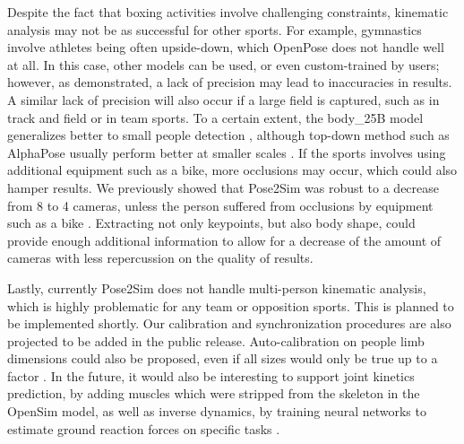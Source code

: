 Despite the fact that boxing activities involve challenging constraints, kinematic analysis may not be as successful for other sports. For example, gymnastics involve athletes being often upside-down, which OpenPose does not handle well at all. In this case, other models can be used, or even custom-trained by users; however, as demonstrated, a lack of precision may lead to inaccuracies in results. A similar lack of precision will also occur if a large field is captured, such as in track and field or in team sports. To a certain extent, the body\_25B model generalizes better to small people detection \cite{Hidalgo2019}, although top-down method such as AlphaPose \cite{Fang2017} usually perform better at smaller scales \cite{Cao2019,Bridgeman2019}. If the sports involves using additional equipment such as a bike, more occlusions may occur, which could also hamper results. We previously showed that Pose2Sim was robust to a decrease from 8 to 4 cameras, unless the person suffered from occlusions by equipment such as a bike \cite{Pagnon2021}. Extracting not only keypoints, but also body shape, could provide enough additional information to allow for a decrease of the amount of cameras with less repercussion on the quality of results. 

Lastly, currently Pose2Sim does not handle multi-person kinematic analysis, which is highly problematic for any team or opposition sports. This is planned to be implemented shortly. Our calibration and synchronization procedures are also projected to be added in the public release. Auto-calibration on people limb dimensions could also be proposed, even if all sizes would only be true up to a factor \cite{Liu2022a}. In the future, it would also be interesting to support joint kinetics prediction, by adding muscles which were stripped from the skeleton in the OpenSim model, as well as inverse dynamics, by training neural networks to estimate ground reaction forces on specific tasks \cite{Oh2013, Johnson2018, Mundt2019, Uhlrich2022}.













